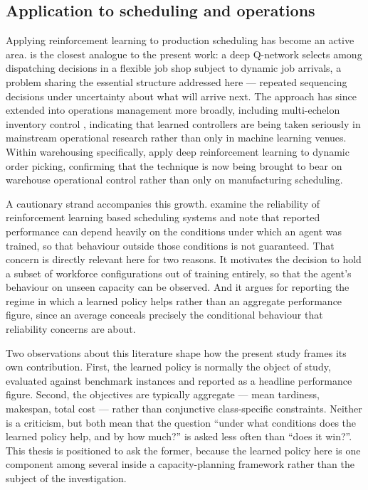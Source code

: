 \subsection{Application to scheduling and operations}

Applying reinforcement learning to production scheduling has become an active area.
\citet{luo2020} is the closest analogue to the present work: a deep Q-network selects among
dispatching decisions in a flexible job shop subject to dynamic job arrivals, a problem sharing
the essential structure addressed here --- repeated sequencing decisions under uncertainty about
what will arrive next. The approach has since extended into operations management more broadly,
including multi-echelon inventory control \citep{liu2024}, indicating that learned controllers
are being taken seriously in mainstream operational research rather than only in machine
learning venues. Within warehousing specifically, \citet{mahmoudinazlou2025} apply deep
reinforcement learning to dynamic order picking, confirming that the technique is now being
brought to bear on warehouse operational control rather than only on manufacturing scheduling.

A cautionary strand accompanies this growth. \citet{waubert2022} examine the reliability of
reinforcement learning based scheduling systems and note that reported performance can depend
heavily on the conditions under which an agent was trained, so that behaviour outside those
conditions is not guaranteed. That concern is directly relevant here for two reasons. It
motivates the decision to hold a subset of workforce configurations out of training entirely, so
that the agent's behaviour on unseen capacity can be observed. And it argues for reporting the
regime in which a learned policy helps rather than an aggregate performance figure, since an
average conceals precisely the conditional behaviour that reliability concerns are about.

Two observations about this literature shape how the present study frames its own contribution.
First, the learned policy is normally the object of study, evaluated against benchmark instances
and reported as a headline performance figure. Second, the objectives are typically aggregate
--- mean tardiness, makespan, total cost --- rather than conjunctive class-specific constraints.
Neither is a criticism, but both mean that the question ``under what conditions does the learned
policy help, and by how much?'' is asked less often than ``does it win?''. This thesis is
positioned to ask the former, because the learned policy here is one component among several
inside a capacity-planning framework rather than the subject of the investigation.

